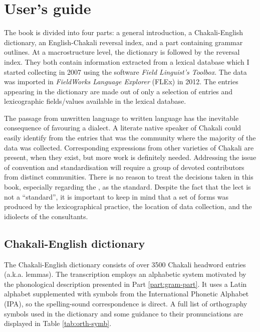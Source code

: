  
\chapter{User's guide}
\label{sec:cont-descr}

The book is divided into four parts: a general introduction, a Chakali-English dictionary, an English-Chakali reversal index, 
and a part containing grammar outlines. At a macrostructure level, the dictionary is followed by the reversal index. They both contain information extracted  from a  lexical database which I started  collecting  in 2007 using the software {\it Field Linguist’s Toolbox}. The data was imported in {\it FieldWorks Language Explorer}  (FLEx) in  2012.  The entries appearing in the dictionary are made out of  only a selection of  entries and lexicographic fields/values available in the lexical database.

The passage from unwritten language to written language has the inevitable consequence of favouring a dialect. A literate native speaker of Chakali could easily identify from the entries that  was the community where the majority of the data was collected.  Corresponding expressions from other varieties of Chakali are present, when they exist,  but more work is definitely needed.   Addressing the issue of convention and standardisation will require a  group of devoted contributors from distinct communities. There is no reason to treat the decisions taken in this book, especially regarding the ,  as the standard. Despite the fact that the  lect is not a ``standard'', it is important to keep in mind that  a set of forms was produced by the lexicographical practice, the location of data collection, and the idiolects of the consultants.

\section{Chakali-English dictionary}
\label{sec:cli-eng-entry}

The Chakali-English dictionary consists of over 3500 Chakali headword entries (a.k.a. lemmas). The transcription employs an alphabetic system motivated by the phonological   description presented in Part \ref{part:gram-part}.  It uses a Latin alphabet supplemented with symbols from the International Phonetic Alphabet (IPA), so the spelling-sound correspondence is direct.  A full list of orthography symbols used in the dictionary and some guidance to their pronunciations are displayed in Table \ref{tab:orth-symb}.


